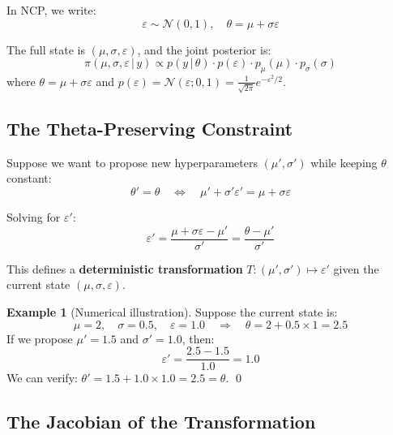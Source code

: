 \documentclass[11pt,a4paper]{article}
\theoremstyle{definition}
\newtheorem{example}[theorem]{Example}
\newcommand{\eps}{\varepsilon}
\newcommand{\Normal}{\mathcal{N}}
\newcommand{\given}{\,|\,}
\begin{document}
In NCP, we write:
\begin{equation}
    \eps \sim \Normal(0,1), \quad \theta = \mu + \sigma \eps
\end{equation}

The full state is $(\mu, \sigma, \eps)$, and the joint posterior is:
\begin{equation}
    \pi(\mu, \sigma, \eps \given y) \propto p(y \given \theta) \cdot p(\eps) \cdot p_\mu(\mu) \cdot p_\sigma(\sigma)
\end{equation}
where $\theta = \mu + \sigma \eps$ and $p(\eps) = \Normal(\eps; 0, 1) = \frac{1}{\sqrt{2\pi}} e^{-\eps^2/2}$.

\subsection{The Theta-Preserving Constraint}

Suppose we want to propose new hyperparameters $(\mu', \sigma')$ while keeping $\theta$ constant:
\begin{equation}
    \theta' = \theta \quad \Longleftrightarrow \quad \mu' + \sigma' \eps' = \mu + \sigma \eps
\end{equation}

Solving for $\eps'$:
\begin{equation}
    \boxed{\eps' = \frac{\mu + \sigma \eps - \mu'}{\sigma'} = \frac{\theta - \mu'}{\sigma'}}
    \label{eq:eps_transform}
\end{equation}

This defines a \textbf{deterministic transformation} $T: (\mu', \sigma') \mapsto \eps'$
given the current state $(\mu, \sigma, \eps)$.

\begin{example}[Numerical illustration]
\label{ex:numerical1}
Suppose the current state is:
\begin{equation}
    \mu = 2, \quad \sigma = 0.5, \quad \eps = 1.0 \quad \Rightarrow \quad \theta = 2 + 0.5 \times 1 = 2.5
\end{equation}
If we propose $\mu' = 1.5$ and $\sigma' = 1.0$, then:
\begin{equation}
    \eps' = \frac{2.5 - 1.5}{1.0} = 1.0
\end{equation}
We can verify: $\theta' = 1.5 + 1.0 \times 1.0 = 2.5 = \theta$. \qed
\end{example}

\subsection{The Jacobian of the Transformation}
\end{document}
